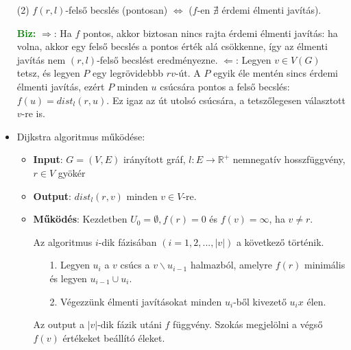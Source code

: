 \documentclass[../../szobeli.tex]{subfiles}
\begin{document}
\begin{itemize}
        (2) $f (r,l)$-felső becslés (pontosan) $\Longleftrightarrow$ ($f$-en $\nexists$ érdemi élmenti javítás).

        \textcolor{green}{\textbf{Biz:}}  $\Rightarrow$: Ha $f$ pontos, akkor biztosan nincs rajta érdemi élmenti javítás: ha volna, akkor egy felső becslés a pontos érték alá csökkenne, így az élmenti javítás nem  $(r,l)$-felső becslést eredményezne. $\Leftarrow$: Legyen $v \in V(G)$ tetsz, és legyen $P$ egy legrövidebbb $rv$-út. A $P$ egyik éle mentén sincs érdemi élmenti javítás, ezért $P$ minden $u$ csúcsára pontos a felső becslés: $f(u) = dist_l(r,u)$. Ez igaz az út utolsó csúcsára, a tetszőlegesen választott $v$-re is.  
        
        \item {Dijkstra algoritmus működése:} \begin{itemize}
            \item \textbf{Input}: $G=(V,E)$ irányított gráf, $l:E\rightarrow \mathbb{R}^+$ nemnegatív hosszfüggvény, $r \in V$ gyökér
            \item \textbf{Output}: $dist_l(r,v)$ minden $v \in V$-re.
            \item \textbf{Működés}: Kezdetben $U_0 = \emptyset, f(r) = 0$ és $f(v) = \infty$, ha $v \neq r$. 
            
            Az algoritmus $i$-dik fázisában $(i=1,2,..., |v|)$ a következő történik. \begin{itemize}
                \item[1.] Legyen $u_i$ a $v$ csúcs a $v\backslash u_{i-1}$ halmazból, amelyre $f(r)$ minimális és legyen $u_{i-1} \cup {u_i}$.
                \item[2.] Végezzünk élmenti javításokat minden $u_i$-ből kivezető $u_ix$ élen.
            \end{itemize}
            
            Az output a $|v|$-dik fázik utáni $f$ függvény. Szokás  megjelölni a végső $f(v)$ értékeket beállító éleket. 
            

\end{itemize}
\end{itemize}
\end{document}
